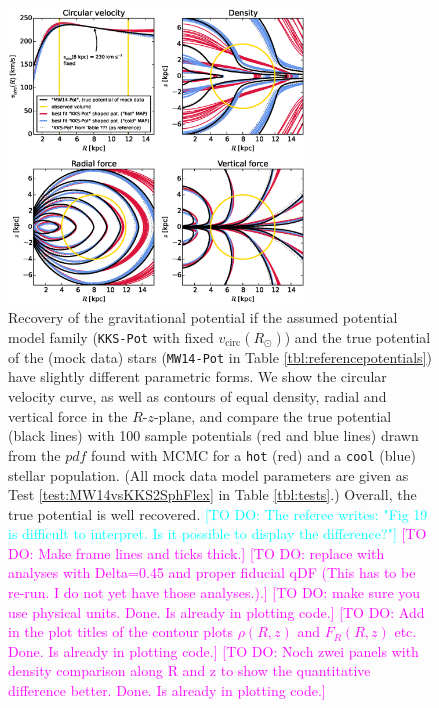 \documentclass[iop,revtex4]{emulateapj}
\newcommand{\pdf}{\ensuremath{pdf}}
\newcommand{\HW}[1]{\textcolor{Cyan}{#1}}
\newcommand{\Wilma}[1]{\textcolor{Magenta}{#1}}
\begin{document}
\begin{figure}[!htbp]
\centering
\includegraphics[width=0.7\textwidth]{figs/MW14vsKKS2SphFlex_contours_compare.eps}
\caption{Recovery of the gravitational potential if the assumed potential model family (\texttt{KKS-Pot} with fixed $v_\text{circ}(R_\odot)$) and the true potential of the (mock data) stars (\texttt{MW14-Pot} in Table \ref{tbl:referencepotentials}) have slightly different parametric forms. We show the circular velocity curve, as well as contours of equal density, radial and vertical force in the $R$-$z$-plane, and compare the true potential (black lines) with 100 sample potentials (red and blue lines) drawn from the \pdf{} found with MCMC for a \texttt{hot} (red) and a \texttt{cool} (blue) stellar population. (All mock data model parameters are given as Test \ref{test:MW14vsKKS2SphFlex} in Table \ref{tbl:tests}.) Overall, the true potential is well recovered. \HW{[TO DO: The referee writes: "Fig 19 is difficult to interpret. Is it possible to display the difference?"]} \Wilma{[TO DO: Make frame lines and ticks thick.]} \Wilma{[TO DO: replace with analyses with Delta=0.45 and proper fiducial qDF (This has to be re-run. I do not yet have those analyses.).]} \Wilma{[TO DO: make sure you use physical units. Done. Is already in plotting code.]} \Wilma{[TO DO: Add in the plot titles of the contour plots $\rho(R,z)$ and $F_R(R,z)$ etc. Done. Is already in plotting code.]} \Wilma{[TO DO: Noch zwei panels with density comparison along R and z to show the quantitative difference better. Done. Is already in plotting code.]}}
\label{fig:MW14vsKKS2SphFlex}
\end{figure}
\end{document}
